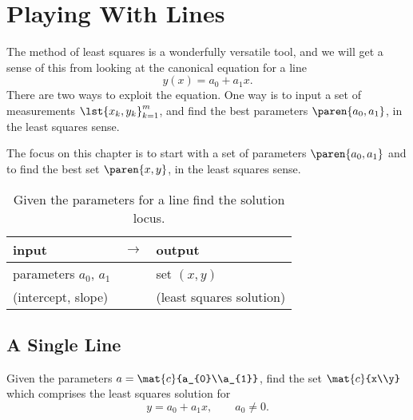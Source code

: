 \chapter{Playing With Lines}

The method of least squares is a wonderfully versatile tool, and we will get a sense of this from looking at the canonical equation for a line
  \begin{equation*}   %
      y(x) = a_{0} + a_{1} x.
  \end{equation*}
There are two ways to exploit the equation. One way is to input a set of measurements $\lst{x_{k},y_{k}}_{k=1}^{m}$, and find the best parameters $\paren{a_{0},a_{1}}$, in the least squares sense. 

The focus on this chapter is to start with a set of parameters $\paren{a_{0},a_{1}}$ and to find the best set $\paren{x, y}$, in the least squares sense.	

\begin{table}[htbp]  %
    \caption{Given the parameters for a line find the solution locus.}
    		\begin{center}
        	\begin{tabular}{lcl}
            input & $\rightarrow$ & output \\\hline
            parameters $a_{0}$, $a_{1}$ && set $(x, y)$\\
	(intercept, slope) && (least squares solution)	
        	\end{tabular}
    		\end{center}
\end{table}%

\section{A Single Line}  %

Given the parameters $a=\mat{c}{a_{0}\\a_{1}}$, find the set $\mat{c}{x\\y}$ which comprises the least squares solution for
  \begin{equation}   %
      y = a_{0} + a_{1} x, \qquad a_{0} \ne 0.
   \label{eq:myline}
  \end{equation}

